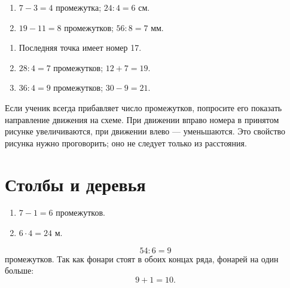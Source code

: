 \reverseexamplefigure

\begin{practicebox}
  \begin{enumerate}[label=\alph*),itemsep=0.55em]
    \item \(7-3=4\) промежутка; \(24:4=6\) см.
    \item \(19-11=8\) промежутков; \(56:8=7\) мм.
  \end{enumerate}
\end{practicebox}

\unknownpointfigure

\begin{practicebox}
  \begin{enumerate}[label=\alph*),itemsep=0.5em]
    \item Последняя точка имеет номер 17.
    \item \(28:4=7\) промежутков; \(12+7=19\).
    \item \(36:4=9\) промежутков; \(30-9=21\).
  \end{enumerate}
\end{practicebox}

\begin{teacherbox}
  Если ученик всегда прибавляет число промежутков, попросите его показать
  направление движения на схеме. При движении вправо номера в принятом
  рисунке увеличиваются, при движении влево --- уменьшаются. Это свойство
  рисунка нужно проговорить; оно не следует только из расстояния.
\end{teacherbox}

\section{Столбы и деревья}

\postrowfigure

\begin{practicebox}
  \begin{enumerate}[label=\alph*),itemsep=0.45em]
    \item \(7-1=6\) промежутков.
    \item \(6\cdot4=24\) м.
  \end{enumerate}
\end{practicebox}

\begin{thinkbox}
  \[
    54:6=9
  \]
  промежутков. Так как фонари стоят в обоих концах ряда, фонарей на один
  больше:
  \[
    9+1=10.
  \]
\end{thinkbox}

